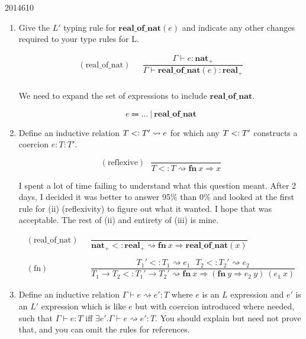 \documentclass[10pt,\jkfside,a4paper]{article}
\begin{document}
\begin{examquestion}{2014}{6}{10}
\begin{enumerate}[label=(\alph*)]
\begin{enumerate}[label=(\roman*)]
\item Give the $L'$ typing rule for $\mathbf{real\_of\_nat}(e)$ and indicate any
other changes required to your type rules for L.

\begin{align*}
(\text{real\_of\_nat}) \ \ \ &
\dfrac{
\Gamma \vdash e: \mathbf{nat}_+
}{
\Gamma \vdash \mathbf{real\_of\_nat}(e): \mathbf{real}_+
}\\
\end{align*}

We need to expand the set of expressions to include $\mathbf{real\_of\_nat}$.

\[
e \Coloneqq \dots \ | \ \mathbf{real\_of\_nat}
\]

\item Define an inductive relation $T <\vcentcolon T' \rightsquigarrow e$ for which
any $T <\vcentcolon T'$ constructs a coercion $e: T: T'$.

\[
(\text{reflexive}) \ \ \
\dfrac{
}{
T <: T \rightsquigarrow \mathbf{fn} \ x \Rightarrow x
}
\]

I spent a lot of time failing to understand what this question meant. After 2
days, I decided it was better to answer 95\% than 0\% and looked at the
first rule for (ii) (reflexivity) to figure out what it wanted. I hope that
was acceptable. The rest of (ii) and entirety of (iii) is mine.

\begin{align*}
(\text{real\_of\_nat}) \ \ \ &
\dfrac{
}{
\mathbf{nat}_+ <: \mathbf{real}_+ \rightsquigarrow
\mathbf{fn} \ x \Rightarrow \mathbf{real\_of\_nat}(x)
}\\\\
(\text{fn}) \ \ \ &
\dfrac{
T_1' <: T_1 \rightsquigarrow e_1 \ \ \
T_2 <: T_2' \rightsquigarrow e_2
}{
T_1 \to T_2 <: T_1' \to T_2' \rightsquigarrow \mathbf{fn} \ x \Rightarrow
(\mathbf{fn} \ y \Rightarrow e_2 \ y) \ (e_1 \ x)
}
\end{align*}

\item Define an inductive relation $\Gamma \vdash e \rightsquigarrow e': T $
where $e$ is an $L$ expression and $e'$ is an $L'$ expression which is like $e$
but with coercion introduced where needed, such that $\Gamma \vdash e: T$
iff $\exists e'. \Gamma \vdash e \rightsquigarrow e': T$. You should explain
but need not prove that, and you can omit the rules for references.


\end{enumerate}
\end{enumerate}
\end{examquestion}
\end{document}
